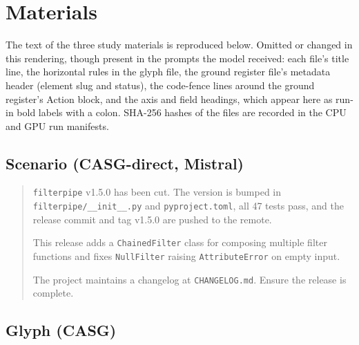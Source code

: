 \documentclass[11pt,a4paper]{article}
\begin{document}
\section{Materials}
\label{app:materials}

The text of the three study materials is reproduced below. Omitted or
changed in this rendering, though present in the prompts the model received:
each file's title line, the horizontal rules in the glyph file, the ground
register file's metadata header (element slug and status), the code-fence
lines around the ground register's Action block, and the axis and field
headings, which appear here as run-in bold labels with a colon.
SHA-256 hashes of the files are recorded in the CPU and GPU run manifests.

\subsection{Scenario (CASG-direct, Mistral)}

\begin{quote}
\texttt{filterpipe} v1.5.0 has been cut. The version is bumped in
\texttt{filterpipe/\_\_init\_\_.py} and \texttt{pyproject.toml}, all 47 tests
pass, and the release commit and tag v1.5.0 are pushed to the remote.

This release adds a \texttt{ChainedFilter} class for composing multiple filter
functions and fixes \texttt{NullFilter} raising \texttt{AttributeError} on
empty input.

The project maintains a changelog at \texttt{CHANGELOG.md}. Ensure the release
is complete.
\end{quote}

\subsection{Glyph (CASG)}
\end{document}
